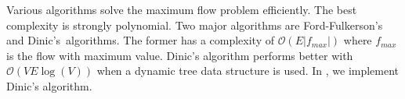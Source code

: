 Various algorithms solve the maximum flow problem efficiently.
The best complexity is strongly polynomial.
Two major algorithms %
are Ford-Fulkerson's\,\cite{ford_fulkerson_1956} and Dinic's\,\cite{dinic1970algorithm} algorithms.
The former has a complexity of $\mathcal{O}(E|f_{max}|)$ where $f_{max}$ is the flow with maximum value.
Dinic's algorithm performs better with $\mathcal{O}(VE\log(V))$ when a dynamic tree data structure is used.
In \appr{}, we implement Dinic’s algorithm.